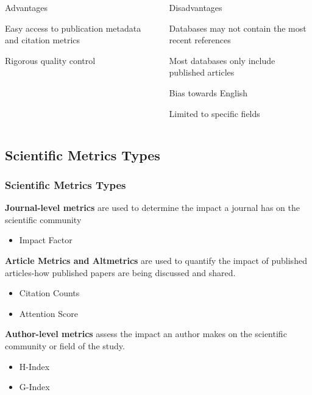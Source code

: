 \documentclass{beamer}
\begin{document}
\begin{frame}
    \begin{columns}[T]
        \begin{column}{.5\textwidth}
            \centering Advantages
            \begin{propslist}
                \item Easy access to publication metadata and citation metrics
                \pause
                \item Rigorous quality control \pause
            \end{propslist}
        \end{column}
        \begin{column}{.5\textwidth}
            \centering Disadvantages %
            \begin{conslist}
                \item Databases may not contain the most recent references \pause
                \item Most databases only include published articles \pause
                \item Bias towards English \pause
                \item Limited to specific fields \pause
            \end{conslist}
        \end{column}
    \end{columns}
\end{frame}
\subsection{Scientific Metrics Types}
\begin{frame}
    \frametitle{Scientific Metrics Types}
    \textbf{Journal-level metrics} are used to determine the impact a journal has on the scientific community
    \begin{itemize}
        \item Impact Factor
    \end{itemize}
    \textbf{Article Metrics and Altmetrics} are used to quantify the impact of published articles-how published papers are being discussed and shared.
    \begin{itemize}
        \item Citation Counts
        \item Attention Score
    \end{itemize}
    \textbf{Author-level metrics} assess the impact an author makes on the scientific community or field of the study.
    \begin{itemize}
        \item H-Index
        \item G-Index
    \end{itemize}

\end{frame}
\end{document}
